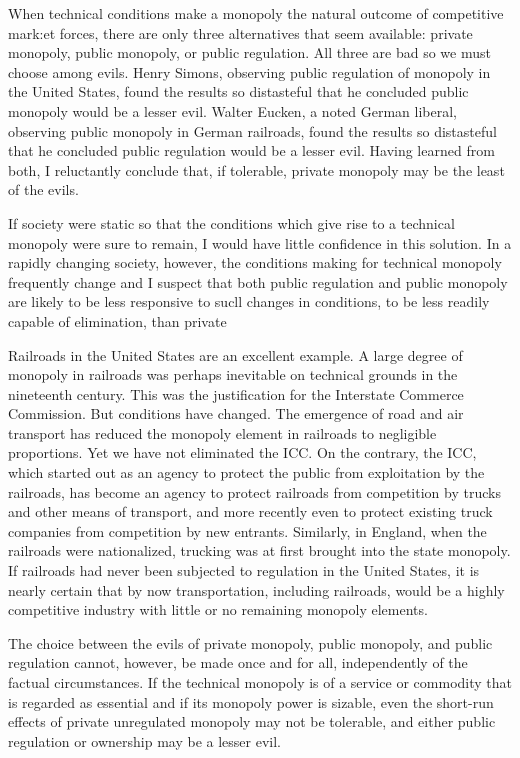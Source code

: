 \documentclass[11pt,openany]{book}
\begin{document}
When technical conditions make a monopoly the natural outcome of competitive mark:et forces, there are only three alternatives that seem available: private monopoly, public monopoly, or public regulation. All three are bad so we must choose among evils. Henry Simons, observing public regulation of monopoly in the United States, found the results so distasteful that he concluded public monopoly would be a lesser evil. Walter Eucken, a noted German liberal, observing public monopoly in German railroads, found the results so distasteful that he concluded public regulation would be a lesser evil. Having learned from both, I reluctantly conclude that, if tolerable, private monopoly may be the least of the evils.

If society were static so that the conditions which give rise to a technical monopoly were sure to remain, I would have little confidence in this solution. In a rapidly changing society, however, the conditions making for technical monopoly frequently change and I suspect that both public regulation and public monopoly are likely to be less responsive to sucll changes in conditions, to be less readily capable of elimination, than private

Railroads in the United States are an excellent example. A large degree of monopoly in railroads was perhaps inevitable on technical grounds in the nineteenth century. This was the justification for the Interstate Commerce Commission. But conditions have changed. The emergence of road and air transport has reduced the monopoly element in railroads to negligible proportions. Yet we have not eliminated the ICC. On the contrary, the ICC, which started out as an agency to protect the public from exploitation by the railroads, has become an agency to protect railroads from competition by trucks and other means of transport, and more recently even to protect existing truck companies from competition by new entrants. Similarly, in England, when the railroads were nationalized, trucking was at first brought into the state monopoly. If railroads had never been subjected to regulation in the United States, it is nearly certain that by now transportation, including railroads, would be a highly competitive industry with little or no remaining monopoly elements.

The choice between the evils of private monopoly, public monopoly, and public regulation cannot, however, be made once and for all, independently of the factual circumstances. If the technical monopoly is of a service or commodity that is regarded as essential and if its monopoly power is sizable, even the short-run effects of private unregulated monopoly may not be tolerable, and either public regulation or ownership may be a lesser evil.
\end{document}
